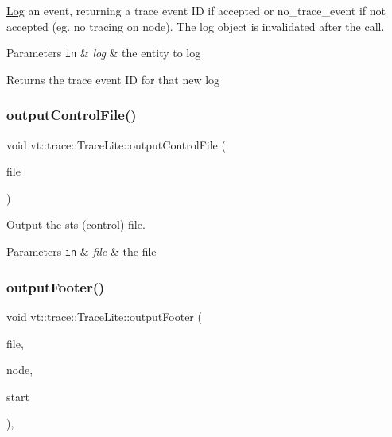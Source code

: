 \hyperlink{structvt_1_1trace_1_1_log}{Log} an event, returning a trace event ID if accepted or {\ttfamily no\+\_\+trace\+\_\+event} if not accepted (eg. no tracing on node). The log object is invalidated after the call. 


\begin{DoxyParams}[1]{Parameters}
\mbox{\tt in}  & {\em log} & the entity to log\\
\hline
\end{DoxyParams}
\begin{DoxyReturn}{Returns}
the trace event ID for that new log 
\end{DoxyReturn}
\mbox{\label{structvt_1_1trace_1_1_trace_lite_a7b60eedbf68a4989a1566f2cf85d94dd}} 
\subsubsection{\texorpdfstring{output\+Control\+File()}{outputControlFile()}}
{\footnotesize\ttfamily void vt\+::trace\+::\+Trace\+Lite\+::output\+Control\+File (\begin{DoxyParamCaption}\item[{std\+::ofstream \&}]{file }\end{DoxyParamCaption})\hspace{0.3cm}{\ttfamily [protected]}}



Output the sts (control) file. 


\begin{DoxyParams}[1]{Parameters}
\mbox{\tt in}  & {\em file} & the file \\
\hline
\end{DoxyParams}
\mbox{\label{structvt_1_1trace_1_1_trace_lite_af0dc30a8b2b52fc291d90f606f585a2d}} 
\subsubsection{\texorpdfstring{output\+Footer()}{outputFooter()}}
{\footnotesize\ttfamily void vt\+::trace\+::\+Trace\+Lite\+::output\+Footer (\begin{DoxyParamCaption}\item[{\hyperlink{structvt_1_1trace_1_1vt__gz_file}{vt\+\_\+gz\+File} $\ast$}]{file,  }\item[{\hyperlink{namespacevt_a866da9d0efc19c0a1ce79e9e492f47e2}{Node\+Type} const}]{node,  }\item[{double const}]{start }\end{DoxyParamCaption})\hspace{0.3cm}{\ttfamily [static]}, {\ttfamily [protected]}}



